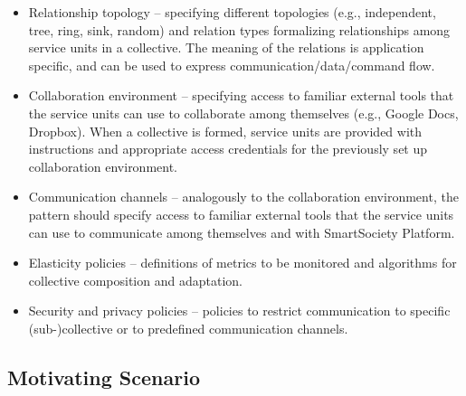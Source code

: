 \documentclass{llncs}
\begin{document}
          \begin{itemize}%
            \item Relationship topology -- specifying different topologies (e.g., independent, tree, ring, sink, random) and relation types formalizing relationships among service units in a collective. The meaning of the relations is application specific, and can be used to express communication/data/command flow. 
            
            \item Collaboration environment -- specifying access to familiar external tools that the service units can use to collaborate among themselves (e.g., Google Docs, Dropbox). When a collective is formed, service units are provided with instructions and appropriate access credentials for the previously set up collaboration environment. 
            
            \item Communication channels -- analogously to the collaboration environment, the pattern should specify access to familiar external tools that the service units can use to communicate among themselves and with SmartSociety Platform. 
            
            \item Elasticity policies -- definitions of metrics to be monitored and algorithms for collective composition and adaptation.

            \item Security and privacy policies -- policies to restrict communication to specific (sub-)collective or to predefined communication channels.
            
          \end{itemize}


    \subsection{Motivating Scenario}
    \label{sec:intro:scenario}
\end{document}
